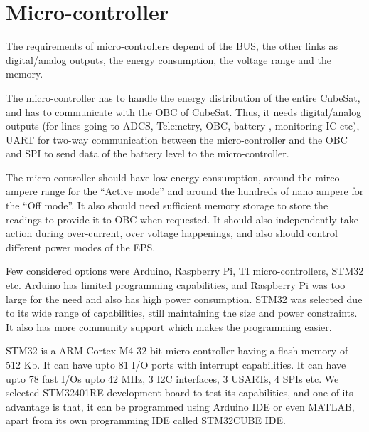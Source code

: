  \section{Micro-controller}
 The requirements of micro-controllers depend of the BUS, the other links as digital/analog outputs, the energy consumption, the voltage range and the memory.
 \par
 The micro-controller has to handle the energy distribution of the entire CubeSat, and has to communicate with the OBC of CubeSat. Thus, it needs digital/analog outputs (for lines going to ADCS, Telemetry, OBC, battery , monitoring IC etc), UART for two-way communication between the micro-controller and the OBC and SPI to  send data of the battery level to the micro-controller.
 \par
 The micro-controller should have low energy consumption, around the mirco ampere range for the “Active mode” and around the hundreds of nano ampere for the “Off mode”. It also should need sufficient memory storage to store the readings to provide it to OBC when requested. It should also independently take action during over-current, over voltage happenings, and also should control different power modes of the EPS.
 \par
 Few considered options were Arduino, Raspberry Pi, TI micro-controllers, STM32 etc. Arduino has limited programming capabilities, and Raspberry Pi was too large for the need and also has high power consumption. STM32 was selected due to its wide range of capabilities, still maintaining the size and power constraints. It also has more community support which makes the programming easier.
 \par
 STM32 is a ARM Cortex M4 32-bit micro-controller having a flash memory of 512 Kb. It can have upto 81 I/O ports with interrupt capabilities. It can have upto 78 fast I/Os upto 42 MHz, 3 I2C interfaces, 3 USARTs, 4 SPIs etc. We selected STM32401RE development board to test its capabilities, and one of its advantage is that, it can be programmed using Arduino IDE or even MATLAB, apart from its own programming IDE called STM32CUBE IDE.